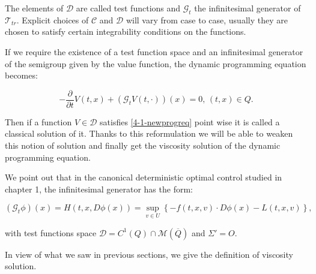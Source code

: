 The elements of $\mathcal{D}$ are called test functions and $\mathcal{G}_t$ the infinitesimal generator of $\mathcal{T}_{tr}$. Explicit choices of $\mathcal{C}$ and 
$\mathcal{D}$ will vary from case to case, usually they are chosen to satisfy certain integrability conditions on the functions. 

If we require the existence of a test function space and an infinitesimal generator of the semigroup given by the value function, the 
dynamic programming equation becomes:

\begin{equation}\label{4-1-newprogreq}
    -\frac{\partial }{\partial t}V(t,x) + (\mathcal{G}_tV(t,\cdot))(x) = 0,\,(t,x)\in Q.
\end{equation}

Then if a function $V\in\mathcal{D}$ satisfies \ref{4-1-newprogreq} point wise it is called a classical solution of it. Thanks to this reformulation we will be able 
to weaken this notion of solution and finally get the viscosity solution of the dynamic programming equation.

We point out that in the canonical deterministic optimal control studied in chapter 1, the infinitesimal generator has the form:

\[(\mathcal{G}_t\phi)(x) = H(t,x,D\phi(x)) = \sup_{v \in U}\left\{-f(t,x,v)\cdot D\phi(x) - L(t,x,v)\right\},\]

with test functions space $\mathcal{D}= C^1(Q)\cap \mathcal{M}(\overline{Q})$ and $\Sigma'=O$.

In view of what we saw in previous sections, we give the definition of viscosity solution. 


